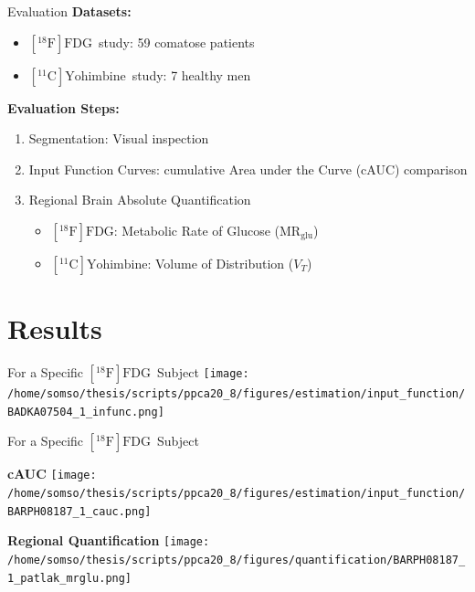 \documentclass[aspectratio=169]{beamer}
\def\mrglu{\text{MR}_{\text{glu}}}
\newcommand{\fdg}{$[^{18}\mathrm{F}]\text{FDG}$}
\newcommand{\yohimbine}{$[^{11}\mathrm{C}]\text{Yohimbine}$}
\begin{document}
\begin{frame}{Evaluation}
	\large{\textbf{Datasets:}}
	\begin{itemize}
		\setlength\itemsep{1.5em}
		\item \fdg\ study: 59 comatose patients
		\item \yohimbine\ study: 7 healthy men
	\end{itemize}
	\vspace{1em}
	\large{\textbf{Evaluation Steps:}}
	\begin{enumerate}
		\setlength\itemsep{1em}
		\item Segmentation: Visual inspection
		\item Input Function Curves: cumulative Area under the Curve (cAUC) comparison
		\item Regional Brain Absolute Quantification
		      \vspace{1ex}
		      \begin{itemize}
			      \setlength\itemsep{1em}
			      \item \fdg : Metabolic Rate of Glucose ($\mrglu$)
			      \item \yohimbine : Volume of Distribution ($V_T$)
		      \end{itemize}
	\end{enumerate}
\end{frame}

\section{Results}

\begin{frame}[t]{For a Specific \fdg\ Subject}
	\texttt{[image: /home/somso/thesis/scripts/ppca20\_8/figures/estimation/input\_function/BADKA07504\_1\_infunc.png]}

\end{frame}

\begin{frame}[t]{For a Specific \fdg\ Subject}
	\begin{center}
		\vfill
		\begin{minipage}{0.48\textwidth}
			\centering
			\textbf{cAUC}
			\texttt{[image: /home/somso/thesis/scripts/ppca20\_8/figures/estimation/input\_function/BARPH08187\_1\_cauc.png]}
		\end{minipage}
		\begin{minipage}{0.48\textwidth}
			\centering
			\textbf{Regional Quantification}
			\texttt{[image: /home/somso/thesis/scripts/ppca20\_8/figures/quantification/BARPH08187\_1\_patlak\_mrglu.png]}
		\end{minipage}
		\vfill
	\end{center}
\end{frame}
\end{document}
